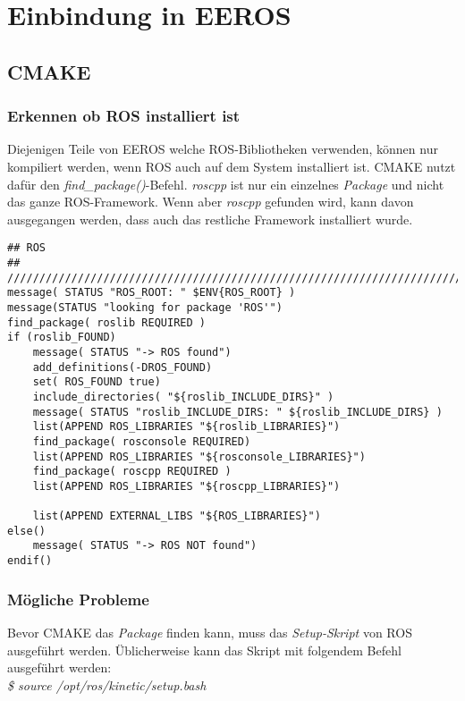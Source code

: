 \chapter{Einbindung in EEROS}


\section{CMAKE}
\subsection{Erkennen ob ROS installiert ist}
Diejenigen Teile von EEROS welche ROS-Bibliotheken verwenden, können nur kompiliert werden, wenn ROS auch auf dem System installiert ist.
CMAKE nutzt dafür den \textit{find\_package()}-Befehl.
\textit{roscpp} ist nur ein  einzelnes \textit{Package} und nicht das ganze ROS-Framework.
Wenn aber \textit{roscpp} gefunden wird, kann davon ausgegangen werden, dass auch das restliche Framework installiert wurde.

\lstset{language=c}
\begin{lstlisting}
## ROS	
## ////////////////////////////////////////////////////////////////////////
message( STATUS "ROS_ROOT: " $ENV{ROS_ROOT} )
message(STATUS "looking for package 'ROS'")
find_package( roslib REQUIRED )
if (roslib_FOUND)
	message( STATUS "-> ROS found")
	add_definitions(-DROS_FOUND)
	set( ROS_FOUND true)
	include_directories( "${roslib_INCLUDE_DIRS}" )
	message( STATUS "roslib_INCLUDE_DIRS: " ${roslib_INCLUDE_DIRS} )
	list(APPEND ROS_LIBRARIES "${roslib_LIBRARIES}")
	find_package( rosconsole REQUIRED)
	list(APPEND ROS_LIBRARIES "${rosconsole_LIBRARIES}")
	find_package( roscpp REQUIRED )
	list(APPEND ROS_LIBRARIES "${roscpp_LIBRARIES}")

	list(APPEND EXTERNAL_LIBS "${ROS_LIBRARIES}")
else()
	message( STATUS "-> ROS NOT found")
endif()
\end{lstlisting}

\subsection{Mögliche Probleme}
Bevor CMAKE das \textit{Package} finden kann, muss das \textit{Setup-Skript} von ROS ausgeführt werden.
Üblicherweise kann das Skript mit folgendem Befehl ausgeführt werden:\\
\textit{\$ source /opt/ros/kinetic/setup.bash}


